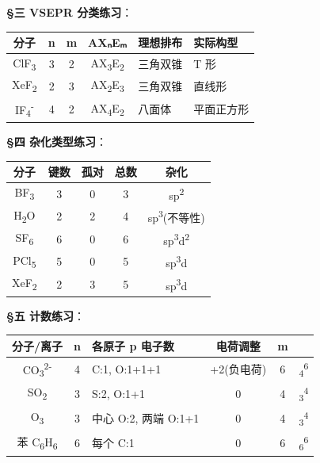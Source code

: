 \textbf{§三 VSEPR 分类练习}：

{\def\LTcaptype{none} %
\begin{longtable}[]{@{}ccccll@{}}
\toprule\noalign{}
分子 & n & m & AXₙEₘ & 理想排布 & 实际构型 \\
\midrule\noalign{}
\endhead
\bottomrule\noalign{}
\endlastfoot
ClF\textsubscript{3} & 3 & 2 & AX\textsubscript{3}E\textsubscript{2} & 三角双锥 & T 形 \\
XeF\textsubscript{2} & 2 & 3 & AX\textsubscript{2}E\textsubscript{3} & 三角双锥 & 直线形 \\
IF\textsubscript{4}\textsuperscript{-} & 4 & 2 & AX\textsubscript{4}E\textsubscript{2} & 八面体 & 平面正方形 \\
\end{longtable}
}

\textbf{§四 杂化类型练习}：

{\def\LTcaptype{none} %
\begin{longtable}[]{@{}ccccc@{}}
\toprule\noalign{}
分子 &  键数 & 孤对 & 总数 & 杂化 \\
\midrule\noalign{}
\endhead
\bottomrule\noalign{}
\endlastfoot
BF\textsubscript{3} & 3 & 0 & 3 & sp\textsuperscript{2} \\
H\textsubscript{2}O & 2 & 2 & 4 & sp\textsuperscript{3}(不等性) \\
SF\textsubscript{6} & 6 & 0 & 6 & sp\textsuperscript{3}d\textsuperscript{2} \\
PCl\textsubscript{5} & 5 & 0 & 5 & sp\textsuperscript{3}d \\
XeF\textsubscript{2} & 2 & 3 & 5 & sp\textsuperscript{3}d \\
\end{longtable}
}

\textbf{§五  计数练习}：

{\def\LTcaptype{none} %
\begin{longtable}[]{@{}cclccc@{}}
\toprule\noalign{}
分子/离子 & n & 各原子 p 电子数 & 电荷调整 & m &  \\
\midrule\noalign{}
\endhead
\bottomrule\noalign{}
\endlastfoot
CO\textsubscript{3}\textsuperscript{2-} & 4 & C:1, O:1+1+1 & +2(负电荷) & 6 & \派\textsubscript{4}\textsuperscript{6} \\
SO\textsubscript{2} & 3 & S:2, O:1+1 & 0 & 4 & \派\textsubscript{3}\textsuperscript{4} \\
O\textsubscript{3} & 3 & 中心 O:2, 两端 O:1+1 & 0 & 4 & \派\textsubscript{3}\textsuperscript{4} \\
苯 C\textsubscript{6}H\textsubscript{6} & 6 & 每个 C:1 & 0 & 6 & \派\textsubscript{6}\textsuperscript{6} \\
\end{longtable}
}

